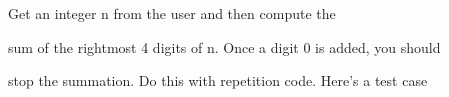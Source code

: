 Get an integer n from the user and then compute the

sum of the rightmost 4 digits of n. Once a digit 0 is added, you should

stop the summation. Do this with repetition code. Here's a test case

